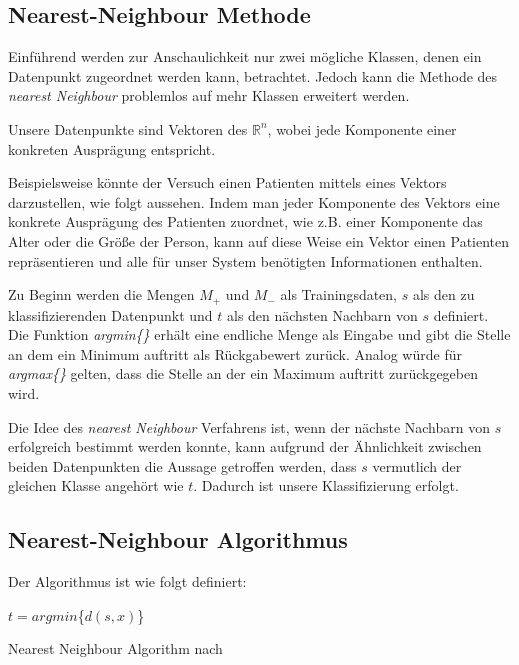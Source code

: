 \documentclass[fontsize=11pt]{scrartcl}
\begin{document}
            \subsection{Nearest-Neighbour Methode}
            \label{subsec:nn-methode}
                Einführend werden zur Anschaulichkeit nur zwei mögliche Klassen, denen ein Datenpunkt zugeordnet werden kann, betrachtet. Jedoch kann die Methode des \emph{nearest Neighbour} problemlos auf mehr Klassen erweitert werden.\par
                Unsere Datenpunkte sind Vektoren des $\mathbb{R}^n$, wobei jede Komponente einer konkreten Ausprägung entspricht.\par
                Beispielsweise könnte der Versuch einen Patienten mittels eines Vektors darzustellen, wie folgt aussehen. Indem man jeder Komponente des Vektors eine konkrete Ausprägung des Patienten zuordnet, wie z.B. einer Komponente das Alter oder die Größe der Person, kann auf diese Weise ein Vektor einen Patienten repräsentieren und alle für unser System benötigten Informationen enthalten.\par
                Zu Beginn werden die Mengen $M_+$ und $M_-$ als Trainingsdaten, $s$ als den zu klassifizierenden Datenpunkt und $t$ als den nächsten Nachbarn von $s$ definiert. Die Funktion \emph{argmin\{\}} erhält eine endliche Menge als Eingabe und gibt die Stelle an dem ein Minimum auftritt als Rückgabewert zurück. Analog würde für \emph{argmax\{\}} gelten, dass die Stelle an der ein Maximum auftritt zurückgegeben wird.\par
                        
                Die Idee des \emph{nearest Neighbour} Verfahrens ist, wenn der nächste Nachbarn von $s$ erfolgreich bestimmt werden konnte, kann aufgrund der Ähnlichkeit zwischen beiden Datenpunkten die Aussage getroffen werden, dass $s$ vermutlich der gleichen Klasse angehört wie $t$. Dadurch ist unsere Klassifizierung erfolgt.
               
                        
            \subsection{Nearest-Neighbour Algorithmus}
            \label{subsec:nnalgo}
             Der Algorithmus ist wie folgt definiert:\par
                            \begin{algorithm}[H]
                                    	$t= argmin$\{$d(s,x)$\}\;
                                    {
                                        \KwRet{-}\;
                                    }
                                \caption{Nearest Neighbour Algorithm nach \cite[S.208]{ertel2016}}
                            \end{algorithm}
				
\end{document}
